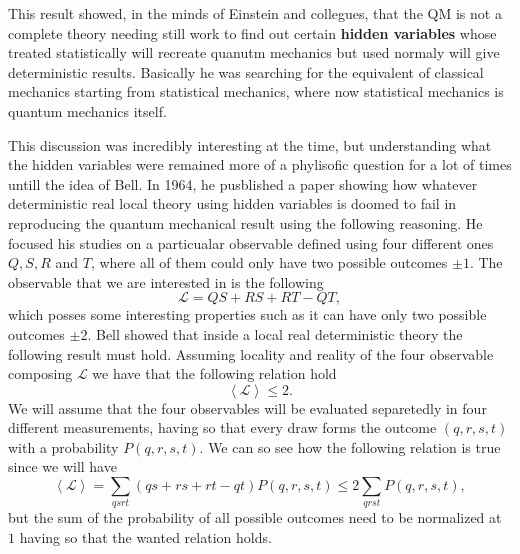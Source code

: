 \noindent
This result showed, in the minds of Einstein and collegues, that the QM is not a complete theory needing still work to find out certain \textbf{hidden variables} whose treated statistically will recreate quanutm mechanics but used normaly will give deterministic results. Basically he was searching for the equivalent of classical mechanics starting from statistical mechanics, where now statistical mechanics is quantum mechanics itself.

This discussion was incredibly interesting at the time, but understanding what the hidden variables were remained more of a phylisofic question for a lot of times untill the idea of Bell. In 1964, he pusblished a paper showing how whatever deterministic real local theory using hidden variables is doomed to fail in reproducing the quantum mechanical result using the following reasoning. He focused his studies on a particualar observable defined using four different ones $Q, S, R$ and $T$, where all of them could only have two possible outcomes $\pm 1$. The observable that we are interested in is the following
\begin{equation}
    \mathcal{L} = QS + RS + RT - QT,
\end{equation}
which posses some interesting properties such as it can have only two possible outcomes $\pm 2$. Bell showed that inside a local real deterministic theory the following result must hold.
{
    Assuming locality and reality of the four observable composing $\mathcal{L}$ we have that the following relation hold
    \begin{equation}
        \left\langle \mathcal{L} \right\rangle \le 2.
    \end{equation}
}
{
    We will assume that the four observables will be evaluated separetedly in four different measurements, having so that every draw forms the outcome $(q, r, s, t)$ with a probability $P(q, r, s, t)$.  We can so see how the following relation is true since we will have
    \begin{equation}
        \left\langle \mathcal{L} \right\rangle = \sum_{qsrt}(qs + rs + rt - qt)P(q, r, s, t) \le 2\sum_{qrst} P(q, r, s, t),
    \end{equation}
    but the sum of the probability of all possible outcomes need to be normalized at $1$ having so that the wanted relation holds.
}

